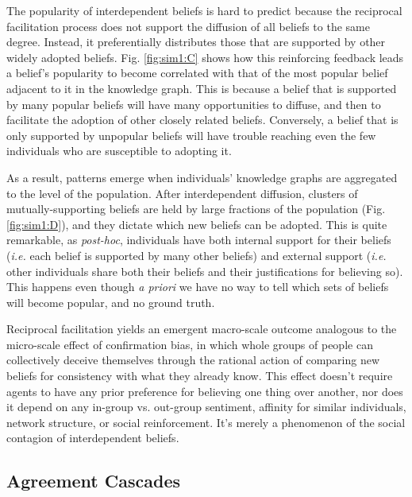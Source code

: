 \documentclass[9pt,twocolumn,twoside,lineno]{pnas-new}
\begin{document}
The popularity of interdependent beliefs is hard to predict because the reciprocal facilitation process does not support the diffusion of all beliefs to the same degree. Instead, it preferentially distributes those that are supported by other widely adopted beliefs. Fig. \ref{fig:sim1:C} shows how this reinforcing feedback leads a belief’s popularity to become correlated with that of the most popular belief adjacent to it in the knowledge graph. This is because a belief that is supported by many popular beliefs will have many opportunities to diffuse, and then to facilitate the adoption of other closely related beliefs. Conversely, a belief that is only supported by unpopular beliefs will have trouble reaching even the few individuals who are susceptible to adopting it. 

As a result, patterns emerge when individuals' knowledge graphs are aggregated to the level of the population. After interdependent diffusion, clusters of mutually-supporting beliefs are held by large fractions of the population (Fig. \ref{fig:sim1:D}), and they dictate which new beliefs can be adopted. This is quite remarkable, as \textit{post-hoc}, individuals have both internal support for their beliefs (\textit{i.e.} each belief is supported by many other beliefs) and external support (\textit{i.e.} other individuals share both their beliefs and their justifications for believing so). This happens even though \textit{a priori} we have no way to tell which sets of beliefs will become popular, and no ground truth. 

Reciprocal facilitation yields an emergent macro-scale outcome analogous to the micro-scale effect of confirmation bias, in which whole groups of people can collectively deceive themselves through the rational action of comparing new beliefs for consistency with what they already know. This effect doesn't require agents to have any prior preference for believing one thing over another, nor does it depend on any in-group vs. out-group sentiment, affinity for similar individuals, network structure, or social reinforcement. It's merely a phenomenon of the social contagion of interdependent beliefs.  

\subsection*{Agreement Cascades}
\end{document}

